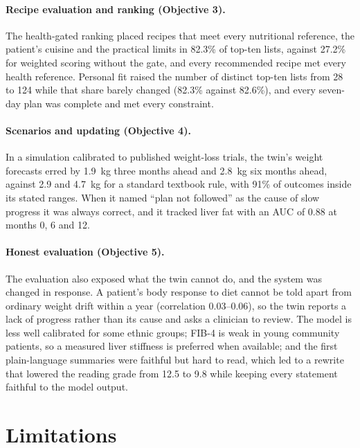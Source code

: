 \paragraph{Recipe evaluation and ranking (Objective 3).} The health-gated
ranking placed recipes that meet every nutritional reference, the patient's
cuisine and the practical limits in 82.3\% of top-ten lists, against 27.2\%
for weighted scoring without the gate, and every recommended recipe met every
health reference. Personal fit raised the number of distinct top-ten lists
from 28 to 124 while that share barely changed (82.3\% against 82.6\%), and
every seven-day plan was
complete and met every constraint.

\paragraph{Scenarios and updating (Objective 4).} In a simulation calibrated
to published weight-loss trials, the twin's weight forecasts erred by 1.9~kg
three months ahead and 2.8~kg six months ahead, against 2.9 and 4.7~kg for a
standard textbook rule, with 91\% of outcomes inside its stated ranges. When
it named ``plan not followed'' as the cause of slow progress it was always
correct, and it tracked liver fat with
an AUC of 0.88 at months 0, 6 and 12.

\paragraph{Honest evaluation (Objective 5).} The evaluation also exposed what
the twin cannot do, and the system was changed in response. A patient's body
response to diet cannot be told apart from ordinary weight drift within a
year (correlation 0.03--0.06), so the twin reports a lack of progress rather
than its cause and asks a clinician to review. The model is less well
calibrated for some ethnic groups; FIB-4 is weak in young community patients,
so a measured liver stiffness is preferred when available; and the first
plain-language summaries were faithful but hard to read, which led to a
rewrite that lowered the reading grade from 12.5 to 9.8 while keeping every
statement faithful to the model output.

\section{Limitations}
\label{sec:c_limitations}

